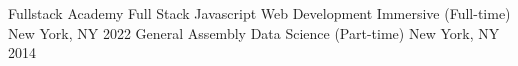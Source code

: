 \begin{cvhonors}
  \cvhonor
    {Fullstack Academy}
    {Full Stack Javascript Web Development Immersive (Full-time)}
    {New York, NY}
    {2022}
  \cvhonor
    {General Assembly}
    {Data Science (Part-time)}
    {New York, NY}
    {2014}
\end{cvhonors}